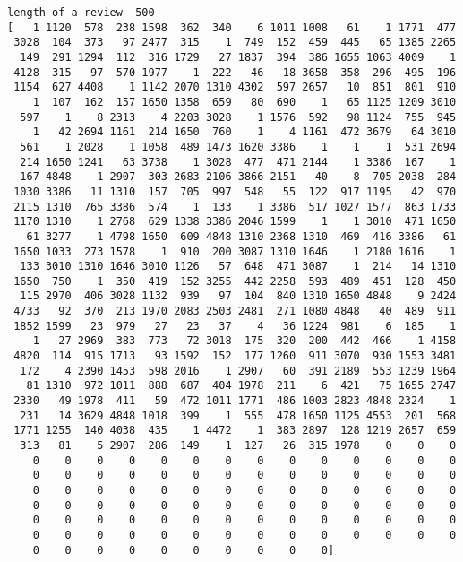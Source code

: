 \documentclass[11pt]{article}
\begin{document}
    \begin{Verbatim}[commandchars=\\\{\}]
length of a review  500
[   1 1120  578  238 1598  362  340    6 1011 1008   61    1 1771  477
 3028  104  373   97 2477  315    1  749  152  459  445   65 1385 2265
  149  291 1294  112  316 1729   27 1837  394  386 1655 1063 4009    1
 4128  315   97  570 1977    1  222   46   18 3658  358  296  495  196
 1154  627 4408    1 1142 2070 1310 4302  597 2657   10  851  801  910
    1  107  162  157 1650 1358  659   80  690    1   65 1125 1209 3010
  597    1    8 2313    4 2203 3028    1 1576  592   98 1124  755  945
    1   42 2694 1161  214 1650  760    1    4 1161  472 3679   64 3010
  561    1 2028    1 1058  489 1473 1620 3386    1    1    1  531 2694
  214 1650 1241   63 3738    1 3028  477  471 2144    1 3386  167    1
  167 4848    1 2907  303 2683 2106 3866 2151   40    8  705 2038  284
 1030 3386   11 1310  157  705  997  548   55  122  917 1195   42  970
 2115 1310  765 3386  574    1  133    1 3386  517 1027 1577  863 1733
 1170 1310    1 2768  629 1338 3386 2046 1599    1    1 3010  471 1650
   61 3277    1 4798 1650  609 4848 1310 2368 1310  469  416 3386   61
 1650 1033  273 1578    1  910  200 3087 1310 1646    1 2180 1616    1
  133 3010 1310 1646 3010 1126   57  648  471 3087    1  214   14 1310
 1650  750    1  350  419  152 3255  442 2258  593  489  451  128  450
  115 2970  406 3028 1132  939   97  104  840 1310 1650 4848    9 2424
 4733   92  370  213 1970 2083 2503 2481  271 1080 4848   40  489  911
 1852 1599   23  979   27   23   37    4   36 1224  981    6  185    1
    1   27 2969  383  773   72 3018  175  320  200  442  466    1 4158
 4820  114  915 1713   93 1592  152  177 1260  911 3070  930 1553 3481
  172    4 2390 1453  598 2016    1 2907   60  391 2189  553 1239 1964
   81 1310  972 1011  888  687  404 1978  211    6  421   75 1655 2747
 2330   49 1978  411   59  472 1011 1771  486 1003 2823 4848 2324    1
  231   14 3629 4848 1018  399    1  555  478 1650 1125 4553  201  568
 1771 1255  140 4038  435    1 4472    1  383 2897  128 1219 2657  659
  313   81    5 2907  286  149    1  127   26  315 1978    0    0    0
    0    0    0    0    0    0    0    0    0    0    0    0    0    0
    0    0    0    0    0    0    0    0    0    0    0    0    0    0
    0    0    0    0    0    0    0    0    0    0    0    0    0    0
    0    0    0    0    0    0    0    0    0    0    0    0    0    0
    0    0    0    0    0    0    0    0    0    0    0    0    0    0
    0    0    0    0    0    0    0    0    0    0    0    0    0    0
    0    0    0    0    0    0    0    0    0    0]
    \end{Verbatim}
\end{document}
